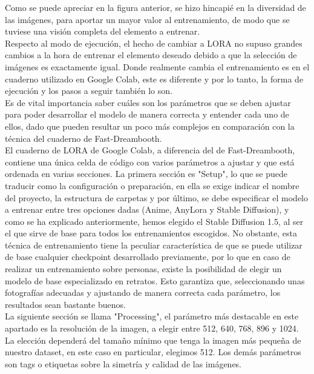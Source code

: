 Como se puede apreciar en la figura anterior, se hizo hincapié en la diversidad de las imágenes, para aportar un mayor valor al entrenamiento, de modo que se tuviese una visión completa del elemento a entrenar.\\

Respecto al modo de ejecución, el hecho de cambiar a LORA no supuso grandes cambios a la hora de entrenar el elemento deseado debido a que la selección de imágenes es exactamente igual. Donde realmente cambia el entrenamiento es en el cuaderno utilizado en Google Colab, este es diferente y por lo tanto, la forma de ejecución y los pasos a seguir también lo son. \\

Es de vital importancia saber cuáles son los parámetros que se deben ajustar para poder desarrollar el modelo de manera correcta y entender cada uno de ellos, dado que pueden resultar un poco más complejos en comparación con la técnica del cuaderno de Fast-Dreambooth.\\

El cuaderno de LORA de Google Colab, a diferencia del de Fast-Dreambooth, contiene una única celda de código con varios parámetros a ajustar y que  está ordenada en varias secciones. La primera sección es "Setup", lo que se puede traducir como la configuración o preparación, en ella se exige indicar el nombre del proyecto, la estructura de carpetas y por último, se debe especificar el modelo a entrenar entre tres opciones dadas (Anime, AnyLora y Stable Diffusion), y como se ha explicado anteriormente, hemos elegido el Stable Diffusion 1.5, al ser el que sirve de base para todos los entrenamientos escogidos. No obstante, esta técnica de entrenamiento tiene la peculiar característica de que se puede utilizar de base cualquier checkpoint desarrollado previamente, por lo que en caso de realizar un entrenamiento sobre personas, existe la posibilidad de elegir un modelo de base especializado en retratos. Esto garantiza que, seleccionando unas fotografías adecuadas y ajustando de manera correcta cada parámetro, los resultados sean bastante buenos.\\

La siguiente sección se llama "Processing", el parámetro más destacable en este apartado es la resolución de la imagen, a elegir entre 512, 640, 768, 896 y 1024. La elección dependerá del tamaño mínimo que tenga la imagen más pequeña de nuestro dataset, en este caso en particular, elegimos 512. Los demás parámetros son tags o etiquetas sobre la simetría y calidad de las imágenes. 


